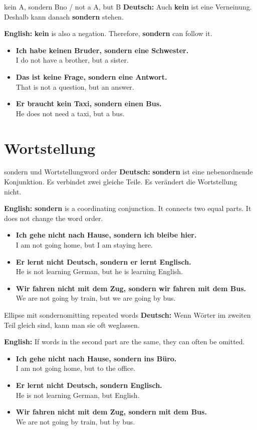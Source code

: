 \documentclass[a4paper,11pt]{article}
\newcommand{\GermanText}[1]{\textbf{Deutsch: }#1\par}
\newcommand{\EnglishText}[1]{{\small\color{SoftGray}\textbf{English: }#1\par}}
\newcommand{\ExampleItem}[2]{\item \textbf{#1}\\{\small\color{SoftGray}#2}}
\begin{document}
\begin{grammarentry}{kein A, sondern B}{no / not a A, but B}
\GermanText{Auch \textbf{kein} ist eine Verneinung. Deshalb kann danach \textbf{sondern} stehen.}
\EnglishText{\textbf{kein} is also a negation. Therefore, \textbf{sondern} can follow it.}

\begin{exbox}
\begin{itemize}
    \ExampleItem{Ich habe keinen Bruder, sondern eine Schwester.}{I do not have a brother, but a sister.}
    \ExampleItem{Das ist keine Frage, sondern eine Antwort.}{That is not a question, but an answer.}
    \ExampleItem{Er braucht kein Taxi, sondern einen Bus.}{He does not need a taxi, but a bus.}
\end{itemize}
\end{exbox}
\end{grammarentry}

\section{Wortstellung}

\begin{grammarentry}{sondern und Wortstellung}{word order}
\GermanText{\textbf{sondern} ist eine nebenordnende Konjunktion. Es verbindet zwei gleiche Teile. Es verändert die Wortstellung nicht.}
\EnglishText{\textbf{sondern} is a coordinating conjunction. It connects two equal parts. It does not change the word order.}

\begin{exbox}
\begin{itemize}
    \ExampleItem{Ich gehe nicht nach Hause, sondern ich bleibe hier.}{I am not going home, but I am staying here.}
    \ExampleItem{Er lernt nicht Deutsch, sondern er lernt Englisch.}{He is not learning German, but he is learning English.}
    \ExampleItem{Wir fahren nicht mit dem Zug, sondern wir fahren mit dem Bus.}{We are not going by train, but we are going by bus.}
\end{itemize}
\end{exbox}
\end{grammarentry}

\begin{grammarentry}{Ellipse mit sondern}{omitting repeated words}
\GermanText{Wenn Wörter im zweiten Teil gleich sind, kann man sie oft weglassen.}
\EnglishText{If words in the second part are the same, they can often be omitted.}

\begin{exbox}
\begin{itemize}
    \ExampleItem{Ich gehe nicht nach Hause, sondern ins Büro.}{I am not going home, but to the office.}
    \ExampleItem{Er lernt nicht Deutsch, sondern Englisch.}{He is not learning German, but English.}
    \ExampleItem{Wir fahren nicht mit dem Zug, sondern mit dem Bus.}{We are not going by train, but by bus.}
\end{itemize}
\end{exbox}
\end{grammarentry}
\end{document}
